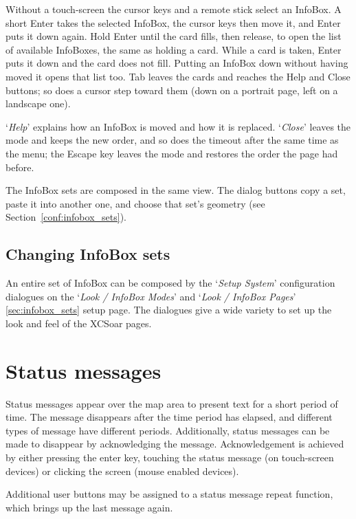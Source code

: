 Without a touch-screen the cursor keys and a remote stick select an
InfoBox.  A short Enter takes the selected InfoBox, the cursor keys
then move it, and Enter puts it down again.  Hold Enter until the
card fills, then release, to open the list of available InfoBoxes,
the same as holding a card.  While a card is taken, Enter puts it
down and the card does not fill.  Putting an InfoBox down without
having moved it opens that list too.  Tab leaves the cards and reaches the
Help and Close buttons; so does a cursor step toward them (down on
a portrait page, left on a landscape one).

`\emph{Help}' explains how an InfoBox is moved and how it is replaced.
`\emph{Close}' leaves the mode and keeps the new order, and so does the
timeout after the same time as the menu; the Escape key leaves the mode
and restores the order the page had before.

The InfoBox sets are composed in the same view.  The dialog buttons
copy a set, paste it into another one, and choose that set's geometry
(see Section~\ref{conf:infobox_sets}).

\subsection*{Changing InfoBox sets}

An entire set of InfoBox can be composed by the `\emph{Setup System}' configuration 
dialogues on the `\emph{Look / InfoBox Modes}' and `\emph{Look / InfoBox Pages}' 
\ref{sec:infobox_sets} setup page. 
The dialogues give a wide variety to set up the look and feel of the XCSoar pages.  


\section{Status messages}

Status messages appear over the map area to present text for a short period of
time.  The message disappears after the time period has elapsed, and different
types of message have different periods. Additionally, status messages can be
made to disappear by acknowledging the message.  Acknowledgement is achieved by
either pressing the enter key, touching the status
message (on touch-screen devices) or clicking the screen (mouse enabled devices).

Additional user buttons may be assigned to a status message repeat function,
which brings up the last message again.

